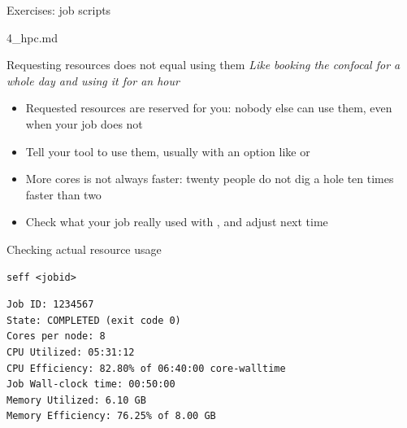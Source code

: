 \begin{frame}{Exercises: job scripts}
\begin{exlist}{4_hpc.md}
\end{exlist}
\end{frame}

\begin{frame}{Requesting resources does not equal using them}
\emph{Like booking the confocal for a whole day and using it for an hour}

\medskip
\begin{itemize}
    \item Requested resources are reserved for you: nobody else can use them, even when your job does not
    \item Tell your tool to use them, usually with an option like
           or 
    \item More cores is not always faster: twenty people do not dig a hole ten times faster than two
    \item Check what your job really used with , and adjust next time
\end{itemize}
\end{frame}

\begin{frame}[fragile]{Checking actual resource usage}
\begin{lstlisting}
seff <jobid>
\end{lstlisting}
\begin{lstlisting}[style=output]
Job ID: 1234567
State: COMPLETED (exit code 0)
Cores per node: 8
CPU Utilized: 05:31:12
CPU Efficiency: 82.80% of 06:40:00 core-walltime
Job Wall-clock time: 00:50:00
Memory Utilized: 6.10 GB
Memory Efficiency: 76.25% of 8.00 GB
\end{lstlisting}
\end{frame}

